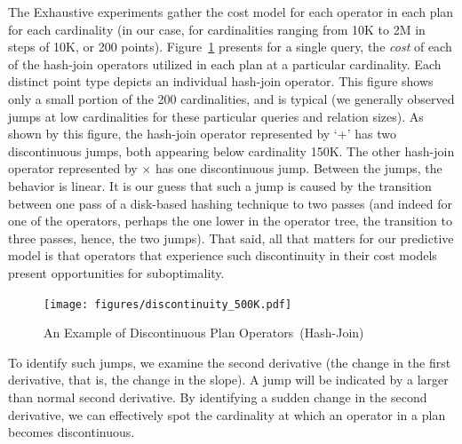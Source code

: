\documentclass[prodmode,acmtods]{acmsmall}
\begin{document}
The Exhaustive experiments gather the cost model for each operator in each
plan for each cardinality (in our case, for cardinalities ranging from 10K
to 2M in steps of 10K, or 200 points).  Figure~\ref{fig:discontinuity}
presents for a single query, the {\em cost} of each of the hash-join operators utilized in
each plan at a particular cardinality. Each distinct point type depicts an
individual hash-join operator.  This
figure shows only a small portion of the 200 cardinalities, and is typical
(we generally observed jumps at low cardinalities for these particular queries and
relation sizes).  As shown by this figure, the hash-join operator
represented by `+' has two discontinuous jumps, both appearing below
cardinality 150K. The other hash-join operator represented by $\times$ has one
discontinuous jump.  Between the jumps, the behavior is linear. It is our
guess that
such a jump is caused by the transition between one pass of a disk-based hashing
technique to two passes (and indeed for one of the operators, perhaps the one
lower in the operator tree, the transition to three passes, hence, the two
jumps). That said, all
that matters for our predictive model is that operators that experience
such discontinuity in their cost models present opportunities for
suboptimality.

\begin{figure}[t]
\centering
\texttt{[image: figures/discontinuity\_500K.pdf]}%
\caption{An Example of Discontinuous Plan \hbox{Operators (Hash-Join)}}
\label{fig:discontinuity}
\end{figure}

To identify such jumps, we examine the second derivative (the change in the
first derivative, that is, the change in the slope). A jump will be indicated by a larger than normal second
derivative. By identifying a sudden change in the second derivative, we can
effectively spot the cardinality at which an operator in a plan becomes
discontinuous.
\end{document}
